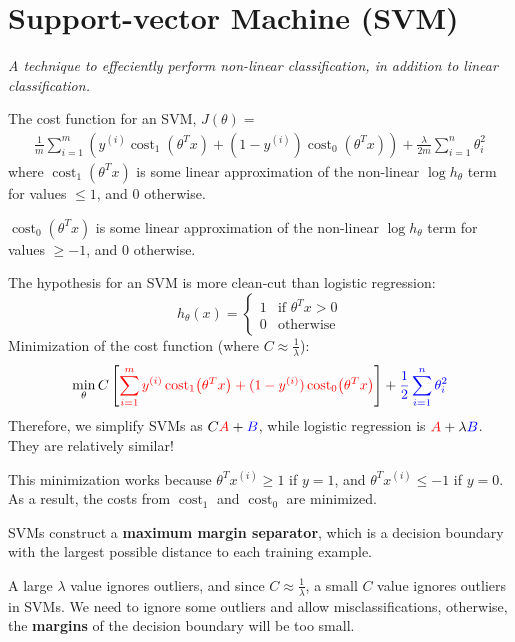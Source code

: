 \section{Support-vector Machine (SVM)}
\emph{A technique to effeciently perform non-linear classification, in addition to linear classification.}

The cost function for an SVM, $J(\theta) = $
\begin{align*}
    \frac{1}{m} \sum_{i=1}^{m} \left(
        y^{(i)} \operatorname{cost}_1 \! \left( \theta^T x \right) +
        (1 - y^{(i)}) \operatorname{cost}_0 \! \left( \theta^T x \right) \right) +
        \frac{\lambda}{2m} \sum_{i=1}^{n} \theta_i^2
\end{align*}
where $\operatorname{cost}_1 \! \left( \theta^Tx \right)$ is some linear approximation
of the non-linear $\log h_\theta$ term for values $\leq 1$, and 0 otherwise.

$\operatorname{cost}_0 \! \left( \theta^Tx \right)$ is some linear approximation
of the non-linear $\log h_\theta$ term for values $\geq -1$, and 0 otherwise.

The hypothesis for an SVM is more clean-cut than logistic regression:
\[ h_\theta(x) = \begin{cases}
    1 & \text{if } \theta^T x > 0 \\
    0 & \text{otherwise}
\end{cases} \]
Minimization of the cost function (where $C \approx \frac{1}{\lambda}$):
\begin{align*}
\min_{\theta} C \left[\textcolor{red}{
    \sum_{i=1}^{m} y^{(i)} \operatorname{cost}_1 \! \left( \theta^T x \right) +
    (1 - y^{(i)}) \operatorname{cost}_0 \! \left( \theta^T x \right)
    }\right]
+ \textcolor{blue}{\frac{1}{2} \sum_{i=1}^{n} \theta_i^2}
\end{align*}
Therefore, we simplify SVMs as $C\textcolor{red}{A} + \textcolor{blue}{B}$,
while logistic regression is $\textcolor{red}{A} + \lambda \textcolor{blue}{B}$.
They are relatively similar!

This minimization works because $\theta^Tx^{(i)} \geq 1$ if $y = 1$,
and $\theta^Tx^{(i)} \leq -1$ if $y = 0$. As a result, the costs from
 $\operatorname{cost}_1$ and $\operatorname{cost}_0$ are minimized.

SVMs construct a \textbf{maximum margin separator}, which is a decision boundary with the
largest possible distance to each training example.

A large $\lambda$ value ignores outliers, and since $C \approx \frac{1}{\lambda}$,
a small $C$ value ignores outliers in SVMs. We need to ignore some outliers and allow
misclassifications, otherwise, the \textbf{margins} of the decision boundary will be too small.

